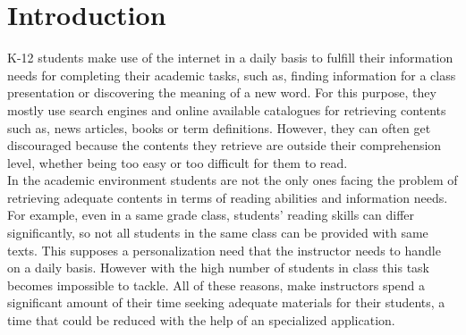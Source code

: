 \documentclass{sig-alternate-05-2015}
\begin{document}





%
%

%
%
\printccsdesc



\section{Introduction}

K-12 students make use of the internet in a daily basis to fulfill their information needs for completing their academic tasks, such as, finding information for a class presentation or discovering the meaning of a new word. For this purpose, they mostly use search engines and online available catalogues for retrieving contents such as, news articles, books or term definitions. However, they can often get discouraged because the contents they retrieve are outside their comprehension level, whether being too easy or too difficult  for them to read.\\



In the academic environment students are not the only ones facing the problem of retrieving adequate contents in terms of reading abilities and information needs. For example, even in a same grade class, students' reading skills can differ significantly, so not all students in the same class can be provided with same texts. This supposes a personalization need that the instructor needs to handle on a daily basis. However with the high number of students in class this task becomes impossible to tackle. All of these reasons, make instructors spend a significant amount of their time seeking adequate materials for their students, a time that could be reduced with the help of an specialized application.\\
\end{document}
